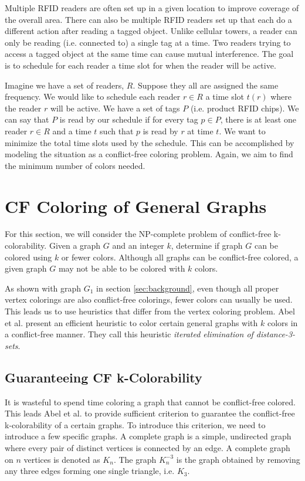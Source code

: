 \documentclass{sig-alternate}
\begin{document}
Multiple RFID readers are often set up in a given location to improve coverage of the overall area. There can also be multiple RFID readers set up that each do a different action after reading a tagged object. Unlike cellular towers, a reader can only be reading (i.e. connected to) a single tag at a time. Two readers trying to access a tagged object at the same time can cause mutual interference. The goal is to schedule for each reader a time slot for when the reader will be active.

Imagine we have a set of readers, $R$. Suppose they all are assigned the same frequency. We would like to schedule each reader $r \in R$ a time slot $t(r)$ where the reader $r$ will be active. We have a set of tags $P$ (i.e. product RFID chips). We can say that $P$ is read by our schedule if for every tag $p \in P$, there is at least one reader $r \in R$ and a time $t$ such that $p$ is read by $r$ at time $t$. We want to minimize the total time slots used by the schedule. This can be accomplished by modeling the situation as a conflict-free coloring problem. Again, we aim to find the minimum number of colors needed. \cite{cheilaris2014strong, smorodinsky2013conflict}

\section{CF Coloring of General Graphs}
\label{sec:general-coloring}
For this section, we will consider the NP-complete problem of conflict-free k-colorability. Given a graph $G$ and an integer $k$, determine if graph $G$ can be colored using $k$ or fewer colors. Although all graphs can be conflict-free colored, a given graph $G$ may not be able to be colored with $k$ colors.

As shown with graph $G_1$ in section \ref{sec:background}, even though all proper vertex colorings are also conflict-free colorings, fewer colors can usually be used. This leads us to use heuristics that differ from the vertex coloring problem. Abel et al. \cite{abel2017three} present an efficient heuristic to color certain general graphs with $k$ colors in a conflict-free manner. They call this heuristic \emph{iterated elimination of distance-3-sets}.

\subsection{Guaranteeing CF k-Colorability}
It is wasteful to spend time coloring a graph that cannot be conflict-free colored. This leads Abel et al. to provide sufficient criterion to guarantee the conflict-free k-colorability of a certain graphs. To introduce this criterion, we need to introduce a few specific graphs. A complete graph is a simple, undirected graph where every pair of distinct vertices is connected by an edge. A complete graph on $n$ vertices is denoted as $K_n$. The graph $K_n^{-3}$ is the graph obtained by removing any three edges forming one single triangle, i.e. $K_3$.
\end{document}
